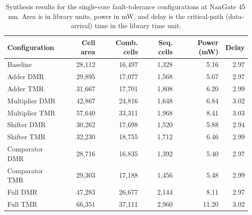 \begin{table}[htbp]
\centering
\caption{Synthesis results for the single-core fault-tolerance configurations at NanGate 45\,nm. Area is in library units, power in mW, and delay is the critical-path (data-arrival) time in the library time unit.}
\label{tab:abs_45nm}
\small
\begin{tabular}{lrrrrr}
\toprule
Configuration & Cell area & Comb. cells & Seq. cells & Power (mW) & Delay \\
\midrule
Baseline & 28,112 & 16,497 & 1,328 & 5.16 & 2.97 \\
Adder DMR & 29,895 & 17,077 & 1,568 & 5.67 & 2.97 \\
Adder TMR & 31,667 & 17,701 & 1,808 & 6.20 & 2.99 \\
Multiplier DMR & 42,867 & 24,816 & 1,648 & 6.84 & 3.02 \\
Multiplier TMR & 57,640 & 33,311 & 1,968 & 8.41 & 3.03 \\
Shifter DMR & 30,262 & 17,698 & 1,520 & 5.88 & 2.94 \\
Shifter TMR & 32,230 & 18,755 & 1,712 & 6.46 & 2.99 \\
Comparator DMR & 28,716 & 16,835 & 1,392 & 5.40 & 2.97 \\
Comparator TMR & 29,303 & 17,188 & 1,456 & 5.48 & 2.99 \\
Full DMR & 47,283 & 26,677 & 2,144 & 8.11 & 2.97 \\
Full TMR & 66,351 & 37,111 & 2,960 & 11.20 & 3.02 \\
\bottomrule
\end{tabular}
\end{table}
